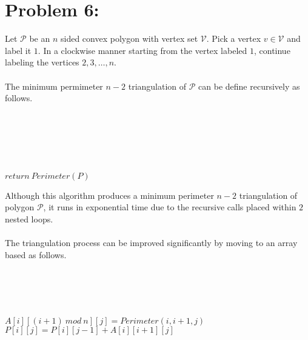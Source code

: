 \documentclass[12pt]{article}
\begin{document}
\section*{Problem 6: }
Let $\mathcal{P}$ be an $n$ sided convex polygon with vertex set
$\mathcal{V}$.  Pick a vertex $v\in\mathcal{V}$ and label it $1$.
In a clockwise manner starting from the vertex labeled $1$, continue
labeling the vertices $2,3,\dots,n$.\\\\
The minimum permimeter $n-2$ triangulation of $\mathcal{P}$ can be
define recursively as follows.\\\\
\begin{algorithm}[H]
\\
\\
\\
\\
{$return\ Perimeter(P)$}
\end{algorithm}
Although this algorithm produces a minimum perimeter $n-2$ triangulation of
polygon $\mathcal{P}$, it runs in exponential time due to the recursive calls
placed within $2$ nested loops.\\\\
The triangulation process can be improved significantly by moving to an
array based as follows.\\\\
\begin{algorithm}[H]
\\
\\
{
{
}
}
\\
{
{
$A[i][(i+1)\ mod\ n][j] = Perimeter(i,i+1,j)$
}
}
{
    {
        $P[i][j] = P[i][j-1]+A[i][i+1][j]$
    }
}

\end{algorithm}
\end{document}
